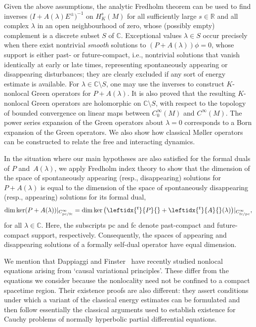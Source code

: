\documentclass[pdftex]{sigma}
\numberwithin{equation}{section}
\newcommand{\CC}{{\mathbb C}}
\newcommand{\RR}{{\mathbb R}}
\newcommand{\fc}{\mathrm{fc}}
\newcommand{\pc}{\mathrm{pc}}
\newcommand{\adj}[1]{\leftidx{^{t}}{#1}{}}
\begin{document}
 Given the above assumptions, the analytic Fredholm theorem can be used to
 find inverses $\big(I+A(\lambda)E^\pm\big)^{-1}$ on $H^s_K(M)$ for all sufficiently large $s\in\RR$ and all complex $\lambda$ in an open neighbourhood of zero,
 whose (possibly empty) complement is a discrete subset $S$ of $\CC$. Exceptional values $\lambda\in S$ occur precisely when there exist nontrivial \emph{smooth} solutions to
 $(P+A(\lambda))\phi = 0$,
 whose support is either past- or future-compact, i.e., nontrivial solutions that vanish identically
 at early or late times, representing spontaneously appearing or disappearing disturbances; they are clearly excluded if any sort of energy estimate is available. For $\lambda\in\CC\setminus S$, one may use the inverses to construct $K$-nonlocal Green operators for $P+A(\lambda)$. It is also proved that the resulting $K$-nonlocal Green operators are holomorphic on $\CC\setminus S$, with respect to the topology of bounded convergence on linear maps between $C_0^\infty(M)$ and $C^\infty(M)$.
 The power series expansion of the Green operators about $\lambda=0$ corresponds to a Born expansion of the Green operators. We also show how classical M{\o}ller operators~\cite{DuetschFredenhagen:2003,HawRej:2020} can be constructed to relate the free and interacting dynamics.

 In the situation where our main hypotheses are also satisfied for the formal duals of $P$ and~$A(\lambda)$, we apply Fredholm index theory to show that the dimension of the space of spontaneously appearing (resp., disappearing) solutions for $P+A(\lambda)$ is equal to the dimension of the space of spontaneously disappearing (resp., appearing) solutions for its formal dual,
 \begin{equation}\label{eq:Fred}
 	\dim\ker (P+A(\lambda))|_{C^\infty_{\pc/\fc}} = \dim\ker \big(\adj{P}+\adj{A}(\lambda)\big)|_{C^\infty_{\fc/\pc}},
 \end{equation}
 for all $\lambda\in \CC$. Here, the subscripts pc and fc denote past-compact and future-compact support, respectively. Consequently, the spaces of appearing and disappearing solutions of a formally self-dual operator have equal dimension.

 We mention that Dappiaggi and Finster~\cite{DappiaggiFinster:2020} have recently studied
 nonlocal equations arising from `causal variational principles'. These differ from the equations we consider because the nonlocality need not be confined to a compact spacetime region. Their existence proofs are also different: they assert conditions under which a variant of the classical energy estimates can be formulated and then follow essentially the classical arguments used to establish existence for Cauchy problems of normally hyperbolic partial differential equations.
\end{document}

